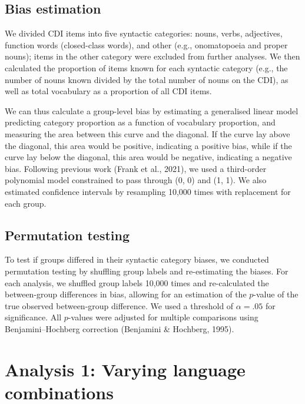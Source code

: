 \documentclass[10pt, letterpaper]{article}
\begin{document}
\subsection{Bias estimation}\label{bias-estimation}

We divided CDI items into five syntactic categories: nouns, verbs,
adjectives, function words (closed-class words), and other (e.g.,
onomatopoeia and proper nouns); items in the other category were
excluded from further analyses. We then calculated the proportion of
items known for each syntactic category (e.g., the number of nouns known
divided by the total number of nouns on the CDI), as well as total
vocabulary as a proportion of all CDI items.

We can thus calculate a group-level bias by estimating a generalised
linear model predicting category proportion as a function of vocabulary
proportion, and measuring the area between this curve and the diagonal.
If the curve lay above the diagonal, this area would be positive,
indicating a positive bias, while if the curve lay below the diagonal,
this area would be negative, indicating a negative bias. Following
previous work (Frank et al., 2021), we used a third-order polynomial
model constrained to pass through (0, 0) and (1, 1). We also estimated
confidence intervals by resampling 10,000 times with replacement for
each group.

\subsection{Permutation testing}\label{permutation-testing}

To test if groups differed in their syntactic category biases, we
conducted permutation testing by shuffling group labels and
re-estimating the biases. For each analysis, we shuffled group labels
10,000 times and re-calculated the between-group differences in bias,
allowing for an estimation of the \(p\)-value of the true observed
between-group difference. We used a threshold of \(\alpha = .05\) for
significance. All \(p\)-values were adjusted for multiple comparisons
using Benjamini--Hochberg correction (Benjamini \& Hochberg, 1995).

\section{Analysis 1: Varying language
combinations}\label{analysis-1-varying-language-combinations}
\end{document}

